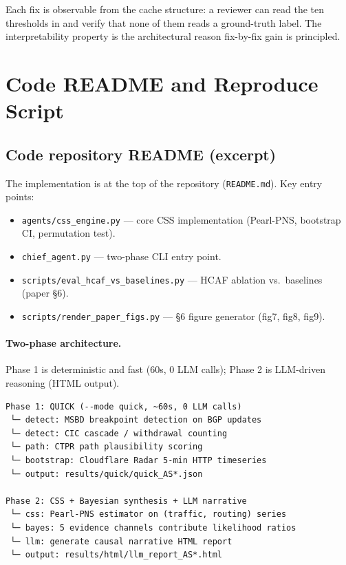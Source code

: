 \documentclass[sigcomm,nonatbib]{acmart}
\begin{document}
Each fix is observable from the cache structure: a
reviewer can read the ten thresholds in
 and verify that none of
them reads a ground-truth label. The interpretability
property is the architectural reason fix-by-fix
gain is principled.

\section{Code README and Reproduce Script}
\label{sec:s4-code}

\subsection{Code repository README (excerpt)}

\noindent The implementation is at the top of the repository
(\texttt{README.md}). Key entry points:

\begin{itemize}
\item \texttt{agents/css\_engine.py} --- core CSS implementation
(Pearl-PNS, bootstrap CI, permutation test).
\item \texttt{chief\_agent.py} --- two-phase CLI entry point.
\item \texttt{scripts/eval\_hcaf\_vs\_baselines.py} --- HCAF
ablation vs.\ baselines (paper \S6).
\item \texttt{scripts/render\_paper\_figs.py} --- \S6 figure
generator (fig7, fig8, fig9).
\end{itemize}

\paragraph{Two-phase architecture.} Phase 1 is deterministic and fast
(60s, 0 LLM calls); Phase 2 is LLM-driven reasoning (HTML output).

\begin{verbatim}
Phase 1: QUICK (--mode quick, ~60s, 0 LLM calls)
 └─ detect: MSBD breakpoint detection on BGP updates
 └─ detect: CIC cascade / withdrawal counting
 └─ path: CTPR path plausibility scoring
 └─ bootstrap: Cloudflare Radar 5-min HTTP timeseries
 └─ output: results/quick/quick_AS*.json

Phase 2: CSS + Bayesian synthesis + LLM narrative
 └─ css: Pearl-PNS estimator on (traffic, routing) series
 └─ bayes: 5 evidence channels contribute likelihood ratios
 └─ llm: generate causal narrative HTML report
 └─ output: results/html/llm_report_AS*.html
\end{verbatim}
\end{document}
